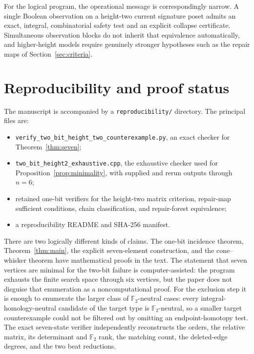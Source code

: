 \documentclass[11pt]{article}
\theoremstyle{definition}
\theoremstyle{remark}
\newcommand{\Ftwo}{\mathbb F_2}
\begin{document}
For the logical program, the operational message is correspondingly narrow.  A single
Boolean observation on a height-two current signature poset admits an exact, integral,
combinatorial safety test and an explicit collapse certificate.  Simultaneous
observation blocks do not inherit that equivalence automatically, and higher-height
models require genuinely stronger hypotheses such as the repair maps of
Section~\ref{sec:criteria}.

\section{Reproducibility and proof status}\label{sec:repro}

The manuscript is accompanied by a \texttt{reproducibility/} directory.  The principal
files are:
\begin{itemize}
\item \texttt{verify\_two\_bit\_height\_two\_counterexample.py}, an exact checker for
Theorem~\ref{thm:seven};
\item \texttt{two\_bit\_height2\_exhaustive.cpp}, the exhaustive checker used for
Proposition~\ref{prop:minimality}, with supplied and rerun outputs through $n=6$;
\item retained one-bit verifiers for the height-two matrix criterion, repair-map
sufficient conditions, chain classification, and repair-forest equivalence;
\item a reproducibility README and SHA-256 manifest.
\end{itemize}

There are two logically different kinds of claims.  The one-bit incidence theorem,
Theorem~\ref{thm:main}, the explicit seven-element construction, and the cone--whisker
theorem have mathematical proofs in the text.  The statement that seven vertices are
minimal for the two-bit failure is computer-assisted: the program exhausts the finite
search space through six vertices, but the paper does not disguise that enumeration as
a noncomputational proof.  For the exclusion step it is enough to enumerate the larger
class of $\Ftwo$-neutral cases: every integral-homology-neutral candidate of the target
type is $\Ftwo$-neutral, so a smaller target counterexample could not be filtered out by
omitting an endpoint-homotopy test.  The exact seven-state verifier independently reconstructs
the orders, the relative matrix, its determinant and $\Ftwo$ rank, the matching count,
the deleted-edge degrees, and the two beat reductions.
\end{document}
